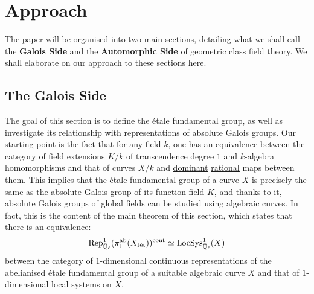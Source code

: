 	\section{Approach}
	    The paper will be organised into two main sections, detailing what we shall call the \textbf{Galois Side} and the \textbf{Automorphic Side} of geometric class field theory. We shall elaborate on our approach to these sections here.

        \subsection{The Galois Side}
            The goal of this section is to define the \'etale fundamental group, as well as investigate its relationship with representations of absolute Galois groups. Our starting point is the fact that for any field $k$, one has an equivalence between the category of field extensions $K/k$ of transcendence degree $1$ and $k$-algebra homomorphisms and that of curves $X/k$ and \href{https://stacks.math.columbia.edu/tag/01RI}{\underline{dominant}} \href{https://stacks.math.columbia.edu/tag/01RR}{\underline{rational}} maps between them. This implies that the \'etale fundamental group of a curve $X$ is precisely the same as the absolute Galois group of its function field $K$, and thanks to it, absolute Galois groups of global fields can be studied using algebraic curves. In fact, this is the content of the main theorem of this section, which states that there is an equivalence:
                $$\mathrm{Rep}^1_{\bar{\mathbb{Q}}_{\ell}}(\pi_1^{\mathrm{ab}}(X_{\mathrm{f\acute{e}t}}))^{\mathrm{cont}} \simeq \mathrm{LocSys}^1_{\bar{\mathbb{Q}}_{\ell}}(X)$$
            between the category of $1$-dimensional continuous representations of the abelianised \'etale fundamental group of a suitable algebraic curve $X$ and that of $1$-dimensional local systems on $X$.
        
